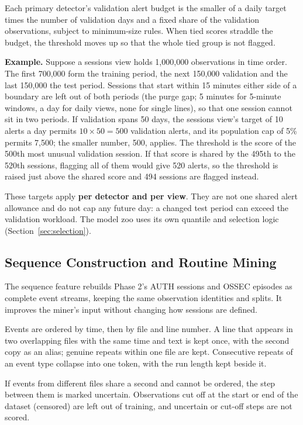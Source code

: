 \documentclass[11pt,a4paper]{article}
\begin{document}
Each primary detector's validation alert budget is the smaller of a daily target times the number of validation days and a fixed share of the validation observations, subject to minimum-size rules. When tied scores straddle the budget, the threshold moves up so that the whole tied group is not flagged.

\textbf{Example.} Suppose a sessions view holds 1,000,000 observations in time order. The first 700,000 form the training period, the next 150,000 validation and the last 150,000 the test period. Sessions that start within 15 minutes either side of a boundary are left out of both periods (the purge gap; 5 minutes for 5-minute windows, a day for daily views, none for single lines), so that one session cannot sit in two periods. If validation spans 50 days, the sessions view's target of 10 alerts a day permits \(10\times50=500\) validation alerts, and its population cap of 5\% permits 7,500; the smaller number, 500, applies. The threshold is the score of the 500th most unusual validation session. If that score is shared by the 495th to the 520th sessions, flagging all of them would give 520 alerts, so the threshold is raised just above the shared score and 494 sessions are flagged instead.

These targets apply \textbf{per detector and per view}. They are not one shared alert allowance and do not cap any future day: a changed test period can exceed the validation workload. The model zoo uses its own quantile and selection logic (Section~\ref{sec:selection}).

\subsection{Sequence Construction and Routine Mining}\label{sec:sequences}

The sequence feature rebuilds Phase 2's AUTH sessions and OSSEC episodes as complete event streams, keeping the same observation identities and splits. It improves the miner's input without changing how sessions are defined.

Events are ordered by time, then by file and line number. A line that appears in two overlapping files with the same time and text is kept once, with the second copy as an alias; genuine repeats within one file are kept. Consecutive repeats of an event type collapse into one token, with the run length kept beside it.

If events from different files share a second and cannot be ordered, the step between them is marked uncertain. Observations cut off at the start or end of the dataset (censored) are left out of training, and uncertain or cut-off steps are not scored.
\end{document}
